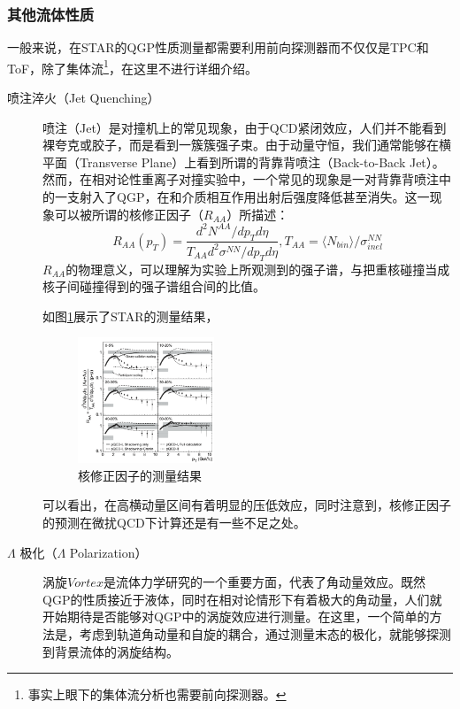 \documentclass[%
 reprint,
 amsmath,amssymb,
 aps,
]{revtex4-1}
\begin{document}
\subsubsection{其他流体性质}
一般来说，在STAR的QGP性质测量都需要利用前向探测器而不仅仅是TPC和ToF，除了集体流\footnote{事实上眼下的集体流分析也需要前向探测器。}，在这里不进行详细介绍。
\begin{description}
    \item[喷注淬火（Jet Quenching）] 喷注（Jet）是对撞机上的常见现象，由于QCD紧闭效应，人们并不能看到裸夸克或胶子，而是看到一簇簇强子束。由于动量守恒，我们通常能够在横平面（Transverse Plane）上看到所谓的背靠背喷注（Back-to-Back Jet）。然而，在相对论性重离子对撞实验中，一个常见的现象是一对背靠背喷注中的一支射入了QGP，在和介质相互作用出射后强度降低甚至消失。这一现象可以被所谓的核修正因子（$R_{AA}$）所描述：
    \begin{equation}
        R_{AA}(p_T) = \frac{d^2 N^{AA}/dp_Td\eta}{T_{AA}d^2 \sigma^{NN}/dp_Td\eta},T_{AA} = \langle N_{bin} \rangle/\sigma^{NN}_{inel}
    \end{equation} 
    $R_{AA}$的物理意义，可以理解为实验上所观测到的强子谱，与把重核碰撞当成核子间碰撞得到的强子谱组合间的比值。

    如图\ref{fig:RAA}展示了STAR的测量结果，
    \begin{figure}[htbp]
        \includegraphics[width=0.4\textwidth]{Plots/RAA.png}
        \caption{\label{fig:RAA}核修正因子的测量结果}
    \end{figure}
    可以看出，在高横动量区间有着明显的压低效应，同时注意到，核修正因子的预测在微扰QCD下计算还是有一些不足之处。
    \item[$\Lambda$ 极化（$\Lambda$ Polarization）] 涡旋$Vortex$是流体力学研究的一个重要方面，代表了角动量效应。既然QGP的性质接近于液体，同时在相对论情形下有着极大的角动量，人们就开始期待是否能够对QGP中的涡旋效应进行测量。在这里，一个简单的方法是，考虑到轨道角动量和自旋的耦合，通过测量末态的极化，就能够探测到背景流体的涡旋结构。
    

\end{description}
\end{document}
